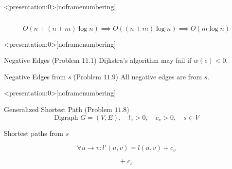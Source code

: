 
\begin{frame}<presentation:0>[noframenumbering]
  \centerline{}
\end{frame}

\begin{frame}{}
  \begin{columns}
	  
  \end{columns}

  \pause
  \vspace{0.60cm}
  \[
    O(n + (n+m) \log n) \implies O((n + m) \log n) \implies O(m \log n)
  \]
\end{frame}

\begin{frame}
  \begin{center}
	\resizebox{0.80\textwidth}{!}{}
  \end{center}
\end{frame}

\begin{frame}<presentation:0>[noframenumbering]
  \begin{exampleblock}{Negative Edges (Problem $11.1$)}
    Dijkstra's algorithm may fail if $w(e) < 0$.
  \end{exampleblock}

\end{frame}

\begin{frame}
  \begin{exampleblock}{Negative Edges from $s$ (Problem $11.9$)}
    All negative edges are from $s$.
  \end{exampleblock}

  \pause
\end{frame}
\begin{frame}<presentation:0>[noframenumbering]
  \begin{exampleblock}{Generalized Shortest Path (Problem $11.8$)}
    \[
      \text{Digraph } G = (V, E),\quad l_e > 0,\quad c_v > 0,\quad s \in V
    \]

    \centerline{Shortest paths from $s$}
  \end{exampleblock}

  \pause
  \[
    \forall u \to v: l'(u,v) = l(u,v) + c_v
  \]

  \pause
  \[
    +\; c_s
  \]
\end{frame}

